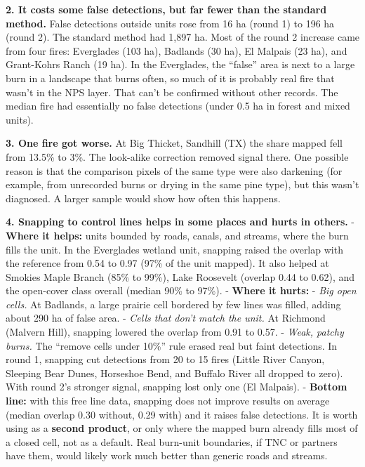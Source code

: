 \documentclass[
]{article}
\begin{document}
\textbf{2. It costs some false detections, but far fewer than the
standard method.} False detections outside units rose from 16 ha (round
1) to 196 ha (round 2). The standard method had 1,897 ha. Most of the
round 2 increase came from four fires: Everglades (103 ha), Badlands (30
ha), El Malpais (23 ha), and Grant-Kohrs Ranch (19 ha). In the
Everglades, the ``false'' area is next to a large burn in a landscape
that burns often, so much of it is probably real fire that wasn't in the
NPS layer. That can't be confirmed without other records. The median
fire had essentially no false detections (under 0.5 ha in forest and
mixed units).

\textbf{3. One fire got worse.} At Big Thicket, Sandhill (TX) the share
mapped fell from 13.5\% to 3\%. The look-alike correction removed signal
there. One possible reason is that the comparison pixels of the same
type were also darkening (for example, from unrecorded burns or drying
in the same pine type), but this wasn't diagnosed. A larger sample would
show how often this happens.

\textbf{4. Snapping to control lines helps in some places and hurts in
others.} - \textbf{Where it helps:} units bounded by roads, canals, and
streams, where the burn fills the unit. In the Everglades wetland unit,
snapping raised the overlap with the reference from 0.54 to 0.97 (97\%
of the unit mapped). It also helped at Smokies Maple Branch (85\% to
99\%), Lake Roosevelt (overlap 0.44 to 0.62), and the open-cover class
overall (median 90\% to 97\%). - \textbf{Where it hurts:} - \emph{Big
open cells.} At Badlands, a large prairie cell bordered by few lines was
filled, adding about 290 ha of false area. - \emph{Cells that don't
match the unit.} At Richmond (Malvern Hill), snapping lowered the
overlap from 0.91 to 0.57. - \emph{Weak, patchy burns.} The ``remove
cells under 10\%'' rule erased real but faint detections. In round 1,
snapping cut detections from 20 to 15 fires (Little River Canyon,
Sleeping Bear Dunes, Horseshoe Bend, and Buffalo River all dropped to
zero). With round 2's stronger signal, snapping lost only one (El
Malpais). - \textbf{Bottom line:} with this free line data, snapping
does not improve results on average (median overlap 0.30 without, 0.29
with) and it raises false detections. It is worth using as a
\textbf{second product}, or only where the mapped burn already fills
most of a closed cell, not as a default. Real burn-unit boundaries, if
TNC or partners have them, would likely work much better than generic
roads and streams.
\end{document}
